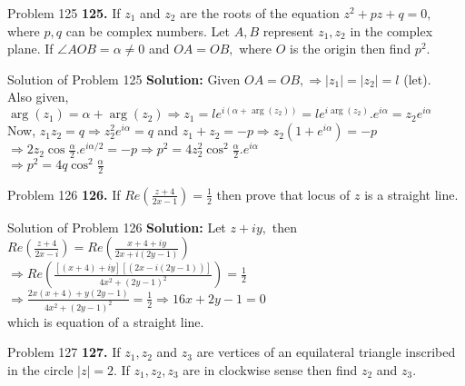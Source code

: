\documentclass[aspectratio=169,8pt]{beamer}
\begin{document}
\begin{frame}{Problem 125}
  \textbf{125.} If $z_1$ and $z_2$ are the roots of the equation $z^2 + pz + q = 0,$ where $p,q$ can be complex numbers. Let $A, B$
  represent $z_1, z_2$ in the complex plane. If $\angle AOB = \alpha \neq 0$ and $OA = OB,$ where $O$ is the origin then find $p^2.$
\end{frame}
\begin{frame}{Solution of Problem 125}
  \textbf{Solution:} Given $OA = OB, \Rightarrow |z_1| = |z_2| = l$ (let).\\
  \vspace*{0.2cm}
  Also given, $\arg(z_1) = \alpha + \arg(z_2) \Rightarrow z_1 = le^{i(\alpha + \arg(z_2))} = le^{i\arg(z_2)}.e^{i\alpha} =
  z_2e^{i\alpha}$\\
  \vspace*{0.2cm}
  Now, $z_1z_2 = q \Rightarrow z_2^2e^{i\alpha} = q$ and $z_1 + z_2 = -p \Rightarrow z_2(1 + e^{i\alpha}) = -p$\\
    \vspace*{0.2cm}
    $\Rightarrow 2z_2\cos\frac{\alpha}{2}.e^{i\alpha/2} = -p \Rightarrow p^2 = 4z_2^2\cos^2\frac{\alpha}{2}.e^{i\alpha}$\\
    \vspace*{0.2cm}
    $\Rightarrow p^2 = 4q\cos^2\frac{\alpha}{2}$
\end{frame}
\begin{frame}{Problem 126}
  \textbf{126.} If $Re\left(\frac{z + 4}{2x - 1}\right) = \frac{1}{2}$ then prove that locus of $z$ is a straight line.
\end{frame}
\begin{frame}{Solution of Problem 126}
  \textbf{Solution:} Let $z + iy,$ then $Re\left(\frac{z + 4}{2x - i}\right) = Re\left(\frac{x + 4 + iy}{2x + i(2y - 1)}\right)$\\
  \vspace*{0.2cm}
  $\Rightarrow Re\left(\frac{[(x + 4) + iy][(2x - i(2y - 1))]}{4x^2 + (2y - 1)^2}\right) = \frac{1}{2}$\\
  \vspace*{0.2cm}
  $\Rightarrow \frac{2x(x + 4) + y(2y - 1)}{4x^2 + (2y - 1)^2} = \frac{1}{2} \Rightarrow 16x + 2y - 1= 0$\\
  \vspace*{0.2cm}
  which is equation of a straight line.
\end{frame}
\begin{frame}{Problem 127}
  \textbf{127.} If $z_1, z_2$ and $z_3$ are vertices of an equilateral triangle inscribed in the circle $|z| = 2.$ If $z_1, z_2,
  z_3$ are in clockwise sense then find $z_2$ and $z_3.$
\end{frame}
\end{document}
